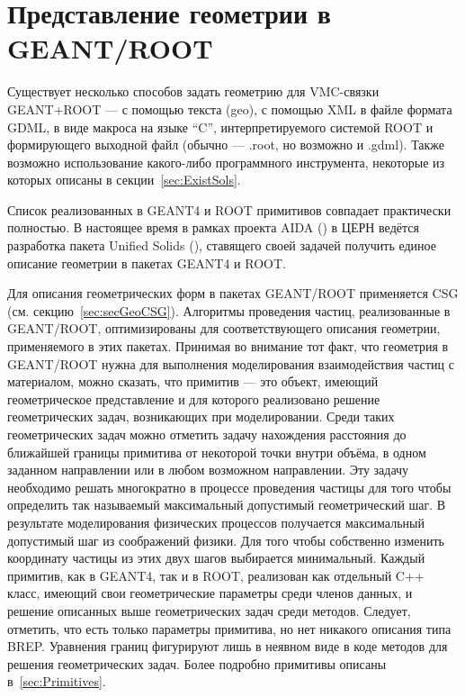 \section{Представление геометрии в GEANT/ROOT}\label{sec:secGeoROOT}

Существует несколько способов задать геометрию для VMC-связки GEANT+ROOT --- с помощью текста (geo), с помощью XML в файле формата GDML, в виде макроса на языке ``C'', интерпретируемого системой ROOT и формирующего выходной файл (обычно --- .root, но возможно и .gdml). Также возможно использование какого-либо программного инструмента, некоторые из которых описаны в секции~\ref{sec:ExistSols}.

Список реализованных в GEANT4 и ROOT примитивов совпадает практически полностью. В настоящее время в рамках проекта AIDA (\cite{}) в ЦЕРН ведётся разработка пакета Unified Solids (\cite{}), ставящего своей задачей получить единое описание геометрии в пакетах GEANT4 и ROOT.

Для описания геометрических форм в пакетах GEANT/ROOT применяется CSG (см. секцию~\ref{sec:secGeoCSG}).
Алгоритмы проведения частиц, реализованные в GEANT/ROOT, оптимизированы для соответствующего описания геометрии, применяемого в этих пакетах.
Принимая во внимание тот факт, что геометрия в GEANT/ROOT нужна для выполнения моделирования взаимодействия частиц с материалом, можно сказать, что примитив --- это объект, имеющий геометрическое представление и для которого реализовано решение геометрических задач, возникающих при моделировании. Среди таких геометрических задач можно отметить задачу нахождения расстояния до ближайшей границы примитива от некоторой точки внутри объёма, в одном заданном направлении или в любом возможном направлении. Эту задачу необходимо решать многократно в процессе проведения частицы для того чтобы определить так называемый максимальный допустимый геометрический шаг. В результате моделирования физических процессов получается максимальный допустимый шаг из соображений физики. Для того чтобы собственно изменить координату частицы из этих двух шагов выбирается минимальный. Каждый примитив, как в GEANT4, так и в ROOT, реализован как отдельный C++ класс, имеющий свои геометрические параметры среди членов данных, и решение описанных выше геометрических задач среди методов. Следует, отметить, что есть только параметры примитива, но нет никакого описания типа BREP. Уравнения границ фигурируют лишь в неявном виде в коде методов для решения геометрических задач. Более подробно примитивы описаны в~\ref{sec:Primitives}.

